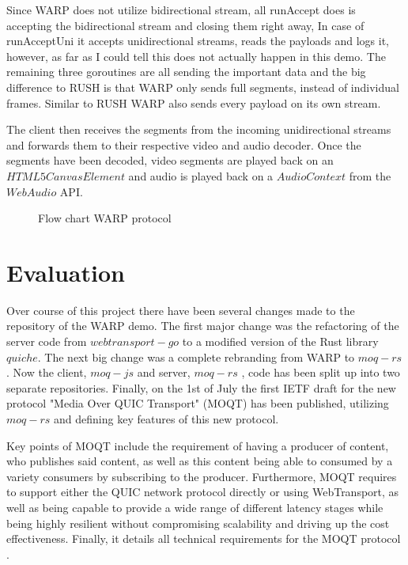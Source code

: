 \documentclass[conference]{IEEEtran}
\begin{document}
Since WARP does not utilize bidirectional stream, all runAccept does is accepting the bidirectional stream and closing them right away, In case of runAcceptUni it accepts unidirectional streams, reads the payloads and logs it, however, as far as I could tell this does not actually happen in this demo. The remaining three goroutines are all sending the important data and the big difference to RUSH is that WARP only sends full segments, instead of individual frames. Similar to RUSH WARP also sends every payload on its own stream.

The client then receives the segments from the incoming unidirectional streams and forwards them to their respective video and audio decoder. Once the segments have been decoded, video segments are played back on an $HTML5CanvasElement$ and audio is played back on a $AudioContext$ from the $WebAudio$ API.

\begin{figure}
    \caption{Flow chart WARP protocol}
    \label{fig:warp}
\end{figure}

\section{Evaluation}
Over course of this project there have been several changes made to the repository of the WARP demo. The first major change was the refactoring of the server code from $webtransport-go$ to a modified version of the Rust library $quiche$. The next big change was a complete rebranding from WARP to $moq-rs$. Now the client, $moq-js$ \cite{b27} and server, $moq-rs$ \cite{b28}, code has been split up into two separate repositories. Finally, on the 1st of July the first IETF draft for the new protocol "Media Over QUIC Transport" (MOQT) \cite{b29} has been published, utilizing $moq-rs$ and defining key features of this new protocol.

Key points of MOQT include the requirement of having a producer of content, who publishes said content, as well as this content being able to consumed by a variety consumers by subscribing to the producer. Furthermore, MOQT requires to support either the QUIC network protocol directly or using WebTransport, as well as being capable to provide a wide range of different latency stages while being highly resilient without compromising scalability and driving up the cost effectiveness. Finally, it details all technical requirements for the MOQT protocol \cite{b29}.
\end{document}
